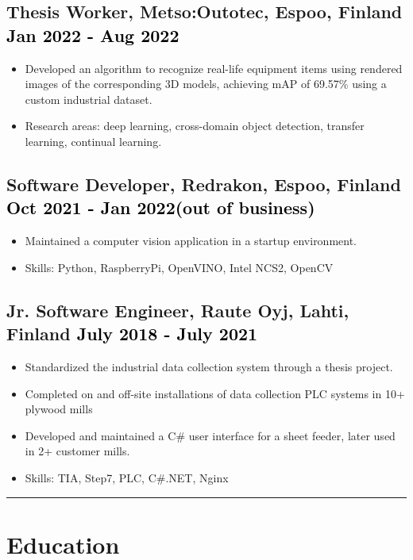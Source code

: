 \documentclass[a4paper,10pt]{article}
\begin{document}
\subsection*{Thesis Worker, Metso:Outotec, Espoo, Finland \hfill \textcolor{black}{Jan 2022 - Aug 2022}}
\begin{itemize}
    \item Developed an algorithm to recognize real-life equipment items using rendered images of the corresponding 3D models, achieving mAP of 69.57\% using a custom industrial dataset.
    \item Research areas: deep learning, cross-domain object detection, transfer learning, continual learning.
\end{itemize}

\subsection*{Software Developer, Redrakon, Espoo, Finland \hfill \textcolor{black}{Oct 2021 - Jan 2022(out of business)}}
\begin{itemize}
    \item Maintained a computer vision application in a startup environment.
    \item Skills: Python, RaspberryPi, OpenVINO, Intel NCS2, OpenCV
\end{itemize}

\subsection*{Jr. Software Engineer, Raute Oyj, Lahti, Finland \hfill \textcolor{black}{July 2018 - July 2021}}
\begin{itemize}
    \item Standardized the industrial data collection system through a thesis project.
    \item Completed on and off-site installations of data collection PLC systems in 10+ plywood mills 
    \item Developed and maintained a C\# user interface for a sheet feeder, later used in 2+ customer mills.
    \item Skills: TIA, Step7, PLC, C\#.NET, Nginx
\end{itemize}

\vspace{0.2cm}
\hrule
\vspace{0.1cm}

\section*{Education}
\end{document}
